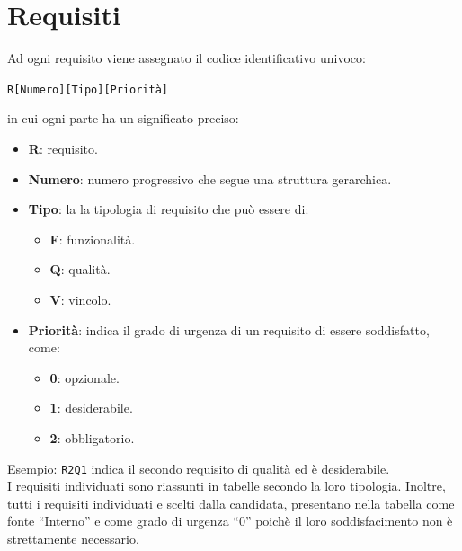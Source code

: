 


\newpage

\section{Requisiti}
Ad ogni requisito viene assegnato il codice identificativo univoco:
	\begin{center}
		\texttt{R[Numero][Tipo][Priorità]}
	\end{center}
	in cui ogni parte ha un significato preciso:
	\begin{itemize}
		\item \textbf{R}: requisito.
		\item \textbf{Numero}: numero progressivo che segue una struttura gerarchica.
		\item \textbf{Tipo}: la la tipologia di requisito che può essere di:
		\begin{itemize}
			\item \textbf{F}: funzionalità.
			\item \textbf{Q}: qualità.
			\item \textbf{V}: vincolo.
		\end{itemize}
		\item \textbf{Priorità}: indica il grado di urgenza di un requisito di essere soddisfatto, come:
		\begin{itemize}
			\item \textbf{0}: opzionale.
			\item \textbf{1}: desiderabile.
			\item \textbf{2}: obbligatorio.
		\end{itemize}
	\end{itemize}


	Esempio: \texttt{R2Q1} indica il secondo requisito di qualità ed è desiderabile. \\

	I requisiti individuati sono riassunti in tabelle secondo la loro tipologia.
	Inoltre, tutti i requisiti individuati e scelti dalla candidata, presentano nella tabella come fonte ``Interno'' e come grado di urgenza ``0'' poichè il loro soddisfacimento non è strettamente necessario.



